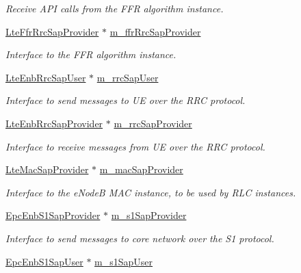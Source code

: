 \begin{DoxyCompactItemize}
\begin{DoxyCompactList}\small\item\em Receive A\+PI calls from the F\+FR algorithm instance. \end{DoxyCompactList}\item 
\hyperlink{classns3_1_1LteFfrRrcSapProvider}{Lte\+Ffr\+Rrc\+Sap\+Provider} $\ast$ \hyperlink{classns3_1_1LteEnbRrc_a59b80550bb8f0690f1a2e2471cd402a9}{m\+\_\+ffr\+Rrc\+Sap\+Provider}
\begin{DoxyCompactList}\small\item\em Interface to the F\+FR algorithm instance. \end{DoxyCompactList}\item 
\hyperlink{classns3_1_1LteEnbRrcSapUser}{Lte\+Enb\+Rrc\+Sap\+User} $\ast$ \hyperlink{classns3_1_1LteEnbRrc_a7bbf35518d70915fcd24d68a835fe6af}{m\+\_\+rrc\+Sap\+User}
\begin{DoxyCompactList}\small\item\em Interface to send messages to UE over the R\+RC protocol. \end{DoxyCompactList}\item 
\hyperlink{classns3_1_1LteEnbRrcSapProvider}{Lte\+Enb\+Rrc\+Sap\+Provider} $\ast$ \hyperlink{classns3_1_1LteEnbRrc_aee933dd53de1635189062fe29a04a1e3}{m\+\_\+rrc\+Sap\+Provider}
\begin{DoxyCompactList}\small\item\em Interface to receive messages from UE over the R\+RC protocol. \end{DoxyCompactList}\item 
\hyperlink{classns3_1_1LteMacSapProvider}{Lte\+Mac\+Sap\+Provider} $\ast$ \hyperlink{classns3_1_1LteEnbRrc_a3137f3e7ee7a047562f78f7779ed5a1f}{m\+\_\+mac\+Sap\+Provider}
\begin{DoxyCompactList}\small\item\em Interface to the e\+NodeB M\+AC instance, to be used by R\+LC instances. \end{DoxyCompactList}\item 
\hyperlink{classns3_1_1EpcEnbS1SapProvider}{Epc\+Enb\+S1\+Sap\+Provider} $\ast$ \hyperlink{classns3_1_1LteEnbRrc_ab64a0d43dde3ba668778ce55146afd02}{m\+\_\+s1\+Sap\+Provider}
\begin{DoxyCompactList}\small\item\em Interface to send messages to core network over the S1 protocol. \end{DoxyCompactList}\item 
\hyperlink{classns3_1_1EpcEnbS1SapUser}{Epc\+Enb\+S1\+Sap\+User} $\ast$ \hyperlink{classns3_1_1LteEnbRrc_af62e6e3a3b5d61968b03900b87387959}{m\+\_\+s1\+Sap\+User}

\end{DoxyCompactItemize}
